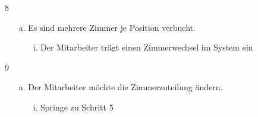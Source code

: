 \documentclass[./detailed_overview_usecases.tex]{subfiles}
\begin{document}
    \item 8 \begin{itemize}
                \item[a.] Es sind mehrere Zimmer je Position verbucht.
                \begin{itemize}
                    \item[i.] Der Mitarbeiter trägt einen Zimmerwechsel im System ein
                \end{itemize}
    \end{itemize}
    \item 9 \begin{itemize}
                \item[a.] Der Mitarbeiter möchte die Zimmerzuteilung ändern.
                \begin{itemize}
                    \item[i.] Springe zu Schritt 5
                \end{itemize}
    \end{itemize}
\end{document}

